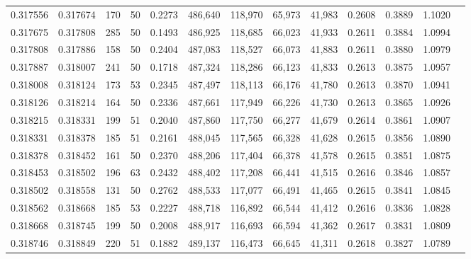 \begin{tabular}{rrrrrrrrrrrrr}
0.317556 & 0.317674 &   170 &  50 &                                     0.2273 & 486,640 & 118,970 &  65,973 &  41,983 & 0.2608 & 0.3889 & 1.1020 \\
0.317675 & 0.317808 &   285 &  50 &                                     0.1493 & 486,925 & 118,685 &  66,023 &  41,933 & 0.2611 & 0.3884 & 1.0994 \\
0.317808 & 0.317886 &   158 &  50 &                                     0.2404 & 487,083 & 118,527 &  66,073 &  41,883 & 0.2611 & 0.3880 & 1.0979 \\
0.317887 & 0.318007 &   241 &  50 &                                     0.1718 & 487,324 & 118,286 &  66,123 &  41,833 & 0.2613 & 0.3875 & 1.0957 \\
0.318008 & 0.318124 &   173 &  53 &                                     0.2345 & 487,497 & 118,113 &  66,176 &  41,780 & 0.2613 & 0.3870 & 1.0941 \\
0.318126 & 0.318214 &   164 &  50 &                                     0.2336 & 487,661 & 117,949 &  66,226 &  41,730 & 0.2613 & 0.3865 & 1.0926 \\
0.318215 & 0.318331 &   199 &  51 &                                     0.2040 & 487,860 & 117,750 &  66,277 &  41,679 & 0.2614 & 0.3861 & 1.0907 \\
0.318331 & 0.318378 &   185 &  51 &                                     0.2161 & 488,045 & 117,565 &  66,328 &  41,628 & 0.2615 & 0.3856 & 1.0890 \\
0.318378 & 0.318452 &   161 &  50 &                                     0.2370 & 488,206 & 117,404 &  66,378 &  41,578 & 0.2615 & 0.3851 & 1.0875 \\
0.318453 & 0.318502 &   196 &  63 &                                     0.2432 & 488,402 & 117,208 &  66,441 &  41,515 & 0.2616 & 0.3846 & 1.0857 \\
0.318502 & 0.318558 &   131 &  50 &                                     0.2762 & 488,533 & 117,077 &  66,491 &  41,465 & 0.2615 & 0.3841 & 1.0845 \\
0.318562 & 0.318668 &   185 &  53 &                                     0.2227 & 488,718 & 116,892 &  66,544 &  41,412 & 0.2616 & 0.3836 & 1.0828 \\
0.318668 & 0.318745 &   199 &  50 &                                     0.2008 & 488,917 & 116,693 &  66,594 &  41,362 & 0.2617 & 0.3831 & 1.0809 \\
0.318746 & 0.318849 &   220 &  51 &                                     0.1882 & 489,137 & 116,473 &  66,645 &  41,311 & 0.2618 & 0.3827 & 1.0789 \\

\end{tabular}
